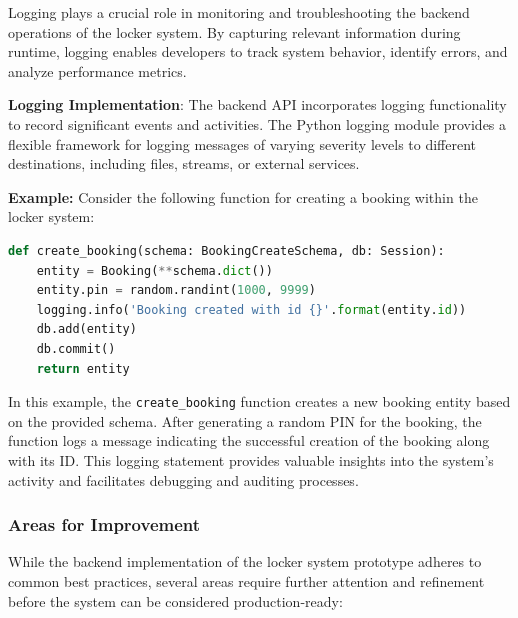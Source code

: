 Logging plays a crucial role in monitoring and troubleshooting the backend operations of the locker system. By capturing relevant information during runtime, logging enables developers to track system behavior, identify errors, and analyze performance metrics.

\textbf{Logging Implementation}:
The backend API incorporates logging functionality to record significant events and activities. The Python logging module provides a flexible framework for logging messages of varying severity levels to different destinations, including files, streams, or external services.

\textbf{Example:} Consider the following function for creating a booking within the locker system:

\begin{lstlisting}[language=Python]
def create_booking(schema: BookingCreateSchema, db: Session):
    entity = Booking(**schema.dict())
    entity.pin = random.randint(1000, 9999)
    logging.info('Booking created with id {}'.format(entity.id))
    db.add(entity)
    db.commit()
    return entity
\end{lstlisting}

In this example, the \texttt{create\_booking} function creates a new booking entity based on the provided schema. After generating a random PIN for the booking, the function logs a message indicating the successful creation of the booking along with its ID. This logging statement provides valuable insights into the system's activity and facilitates debugging and auditing processes.

\subsubsection{Areas for Improvement}

While the backend implementation of the locker system prototype adheres to common best practices, several areas require further attention and refinement before the system can be considered production-ready:

